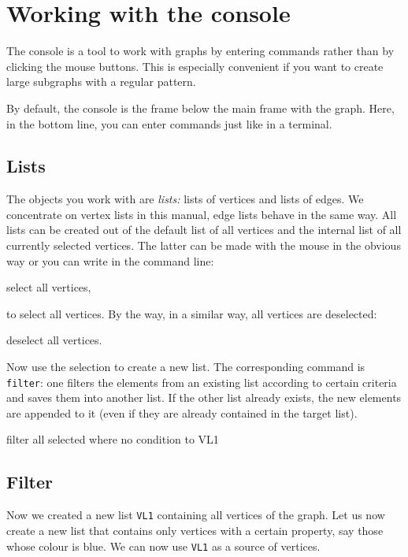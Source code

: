 \section{Working with the console}

The console is a tool to work with graphs by entering commands rather
than by clicking the mouse buttons. This is especially convenient if
you want to create large subgraphs with a regular pattern.

By default, the console is the frame below the main frame with the
graph. Here, in the bottom line, you can enter commands just like in a
terminal.

\subsection{Lists}

The objects you work with are \emph{lists:} lists of vertices and
lists of edges. We concentrate on vertex lists in this manual, edge
lists behave in the same way. All lists can be created out of the
default list of all vertices and the internal list of all currently
selected vertices. The latter can be made with the mouse in the
obvious way or you can write in the command line:
\begin{tcolorbox}
  select all vertices,
\end{tcolorbox}
\noindent
to select all vertices. By the way, in a similar way, all vertices are
deselected:
\begin{tcolorbox}
deselect all vertices.
\end{tcolorbox}

Now use the selection to create a new list. The corresponding command
is \texttt{filter}: one filters the elements from an existing list
according to certain criteria and saves them into another list. If the
other list already exists, the new elements are appended to it (even
if they are already contained in the target list). 

\begin{tcolorbox}
  filter all selected where no condition to VL1
\end{tcolorbox}

\subsection{Filter}

Now we created a new list \texttt{VL1} containing all vertices of the
graph. Let us now create a new list that contains only vertices with a
certain property, say those whose colour is blue. We can now use
\texttt{VL1} as a source of vertices.

